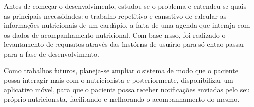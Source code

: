 \documentclass[
	12pt,				%
    oneside,			%
	a4paper,			%
	english,			%
	french,				%
	spanish,			%
	brazil,				%
	]{abntex2}
\begin{document}
Antes de começar o desenvolvimento, estudou-se o problema e entendeu-se
quais as principais necessidades: o trabalho repetitivo e cansativo de calcular as
informações nutricionais de um cardápio, a falta de uma agenda que interaja com os
dados de acompanhamento nutricional. Com base nisso, foi realizado o levantamento de
requisitos através das histórias de usuário para só então passar para a fase de
desenvolvimento.

Como trabalhos futuros, planeja-se ampliar o sistema de modo que o paciente
possa interagir mais com o nutricionista e posteriormente, disponibilizar um aplicativo
móvel, para que o paciente possa receber notificações enviadas pelo seu próprio
nutricionista, facilitando e melhorando o acompanhamento do mesmo.

\postextual



%
%






\end{document}
